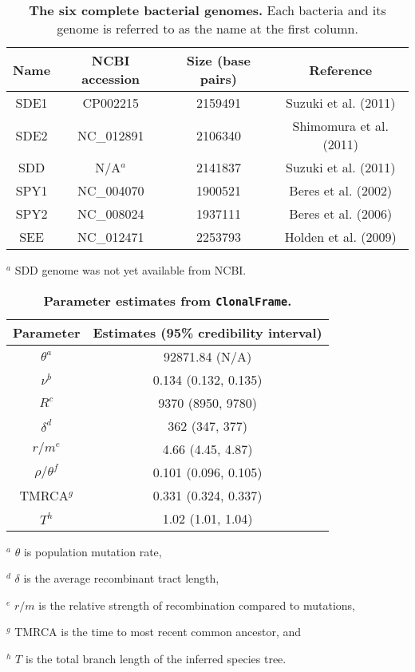 \documentclass[10pt]{article}
\providecommand{\tabularnewline}{\\}
\begin{document}
\begin{table}[!ht]
\caption{
{\bf The six complete bacterial genomes.}
Each bacteria and its genome is referred to as the name at the first column.}
\noindent \begin{centering}
\begin{tabular}{cccc}
\hline 
Name & NCBI accession & Size (base pairs) & Reference\tabularnewline
\hline
SDE1 & CP002215 & 2159491 & Suzuki et al. (2011)\tabularnewline
SDE2 & NC\_012891 & 2106340 & Shimomura et al. (2011)\tabularnewline
SDD & N/A$^a$ & 2141837 & Suzuki et al. (2011)\tabularnewline
SPY1 & NC\_004070 & 1900521 & Beres et al. (2002)\tabularnewline
SPY2 & NC\_008024 & 1937111 & Beres et al. (2006)\tabularnewline
SEE & NC\_012471 & 2253793 & Holden et al. (2009)\tabularnewline
\hline
\end{tabular}
\par\end{centering}
\begin{flushleft}
$^a$ SDD genome was not yet available from NCBI.
\end{flushleft}
\label{tab:genome}
\end{table}

\begin{table}[!ht]
\caption{
{\bf Parameter estimates from \texttt{ClonalFrame}.}}
\noindent \centering{}\begin{tabular}{cc}
\hline
Parameter & Estimates (95\% credibility interval) \tabularnewline
\hline
$\theta^a$ & 92871.84 (N/A)\tabularnewline
$\nu^b$ & 0.134 (0.132, 0.135)\tabularnewline
$R^c$ & 9370 (8950, 9780)\tabularnewline
$\delta^d$ & 362 (347, 377)\tabularnewline
$r/m^e$ & 4.66 (4.45, 4.87)\tabularnewline
$\rho/\theta^f$ & 0.101 (0.096, 0.105)\tabularnewline
TMRCA$^g$ & 0.331 (0.324, 0.337)\tabularnewline
$T^h$ & 1.02 (1.01, 1.04)\tabularnewline
\hline
\end{tabular}
\begin{flushleft}
$^a$ $\theta$ is population mutation rate,

$^d$ $\delta$ is the average recombinant tract length,

$^e$ $r/m$ is the relative strength of recombination compared to mutations,

$^g$ TMRCA is the time to most recent common ancestor, and

$^h$ $T$ is the total branch length of the inferred species tree.
\end{flushleft}
\label{tab:clonalframe}
\end{table}
\end{document}
